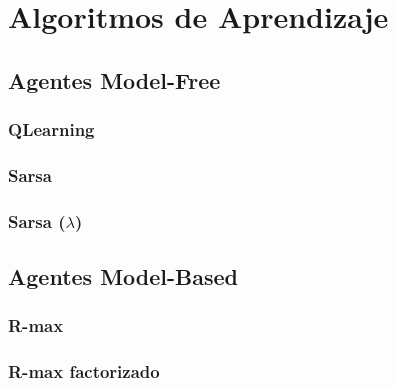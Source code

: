 \documentclass[a4paper,spanish] {article}
\begin{document}
\section{Algoritmos de Aprendizaje}
	\subsection{Agentes Model-Free}
		\subsubsection{QLearning}
		\subsubsection{Sarsa}
		\subsubsection{Sarsa ($\lambda$)}	
	\subsection{Agentes Model-Based}	
		\subsubsection{R-max}
		\subsubsection{R-max factorizado}



		


		
		

		
		
		
		
\newpage
\tableofcontents
\newpage
	 
	
\end{document}
